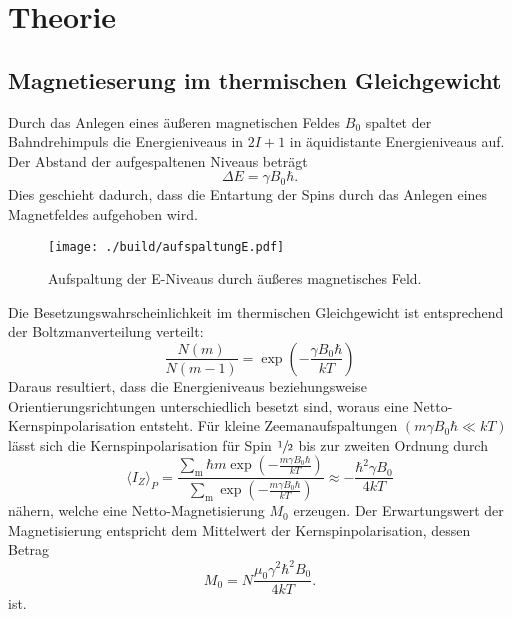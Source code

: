 \section{Theorie}%
\label{sec:theorie}
\subsection{Magnetieserung im thermischen Gleichgewicht}%
\label{ssub:magnetieserung_im_thermischen_gleichgewicht}
Durch das Anlegen eines äußeren magnetischen Feldes $B_0$ spaltet der Bahndrehimpuls die Energieniveaus in $2 I
+ 1$ in äquidistante Energieniveaus auf. 
Der Abstand der aufgespaltenen Niveaus beträgt 
\begin{equation}
		\label{eq:delta_e}
		\Delta E = \gamma B_0 \hbar. 
\end{equation}
Dies geschieht dadurch, dass die Entartung der Spins durch das Anlegen eines
Magnetfeldes aufgehoben wird.
\begin{figure}[ht]
		\centering
		\texttt{[image: ./build/aufspaltungE.pdf]}
		\caption{Aufspaltung der E-Niveaus durch äußeres magnetisches Feld.}
		\label{fig:aufsp_E}
\end{figure}
Die Besetzungswahrscheinlichkeit im thermischen Gleichgewicht ist entsprechend
der Boltzmanverteilung verteilt:
\begin{equation}
		\label{eq:boltzmann}
		\frac{N(m)}{N(m-1)} = \exp \left( - \frac{\gamma B_0 \hbar}{kT} \right)
\end{equation}
Daraus resultiert, dass die Energieniveaus beziehungsweise Orientierungsrichtungen unterschiedlich
besetzt sind, woraus eine Netto-Kernspinpolarisation entsteht. 
Für kleine Zeemanaufspaltungen $(m \gamma B_0 \hbar \ll kT)$ lässt sich die
Kernspinpolarisation für Spin $\sfrac{1}{2}$ bis zur
zweiten Ordnung durch
\begin{equation}
		\label{eq:kernpo}
		\langle I_Z \rangle_P = \frac{\sum_\text{m} \hbar m \exp\left(-\frac{m \gamma B_0
		\hbar}{kT}\right)}{\sum_\text{m}\exp\left(-\frac{m \gamma B_0
		\hbar}{kT}\right)} \approx - \frac{\hbar^2 \gamma B_0}{4 kT}
\end{equation}
nähern, welche eine Netto-Magnetisierung $M_0$ erzeugen. 
Der Erwartungswert der Magnetisierung entspricht dem Mittelwert der
Kernspinpolarisation, dessen Betrag 
\begin{equation}
		\label{eq:magn}
		M_0 = N \frac{\mu_0 \gamma^2 \hbar^2 B_0}{4 kT} .
\end{equation}
ist.

